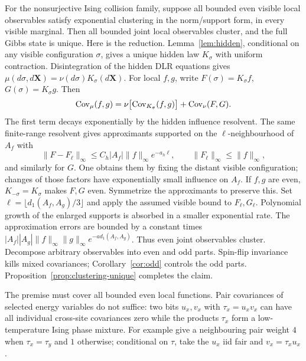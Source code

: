 \begin{remark}\label{rem:hidden-reduction}
For the nonsurjective Ising collision family, suppose all bounded even visible local observables satisfy exponential clustering in the norm/support form, in every visible marginal. Then all bounded joint local observables cluster, and the full Gibbs state is unique. Here is the reduction. Lemma~\ref{lem:hidden}, conditional on any visible configuration $\sigma$, gives a unique hidden law $K_\sigma$ with uniform contraction. Disintegration of the hidden DLR equations gives $\mu(d\sigma,d\mathbf X)=\nu(d\sigma)K_\sigma(d\mathbf X)$. For local $f,g$, write $F(\sigma)=K_\sigma f$, $G(\sigma)=K_\sigma g$. Then
\[
 \operatorname{Cov}_\mu(f,g)=\nu\bigl[\operatorname{Cov}_{K_\sigma}(f,g)\bigr]+\operatorname{Cov}_\nu(F,G).
\]
The first term decays exponentially by the hidden influence resolvent. The same finite-range resolvent gives approximants supported on the $\ell$-neighbourhood of $A_f$ with
\[
 \|F-F_\ell\|_\infty\le C_h|A_f|\|f\|_\infty e^{-a_h\ell},
 \qquad \|F_\ell\|_\infty\le\|f\|_\infty,
\]
and similarly for $G$. One obtains them by fixing the distant visible configuration; changes of those factors have exponentially small influence on $A_f$. If $f,g$ are even, $K_{-\sigma}=K_\sigma$ makes $F,G$ even. Symmetrize the approximants to preserve this. Set $\ell=\lfloor d_1(A_f,A_g)/3\rfloor$ and apply the assumed visible bound to $F_\ell,G_\ell$. Polynomial growth of the enlarged supports is absorbed in a smaller exponential rate. The approximation errors are bounded by a constant times $|A_f||A_g|\|f\|_\infty\|g\|_\infty e^{-a d_1(A_f,A_g)}$. Thus even joint observables cluster. Decompose arbitrary observables into even and odd parts. Spin-flip invariance kills mixed covariances; Corollary~\ref{cor:odd} controls the odd parts. Proposition~\ref{prop:clustering-unique} completes the claim.

The premise must cover all bounded even local functions. Pair covariances of selected energy variables do not suffice: two bits $u_x,v_x$ with $\tau_x=u_xv_x$ can have all individual cross-site covariances zero while the products $\tau_x$ form a low-temperature Ising phase mixture. For example give a neighbouring pair weight $4$ when $\tau_x=\tau_y$ and $1$ otherwise; conditional on $\tau$, take the $u_x$ iid fair and $v_x=\tau_xu_x$.
\end{remark}

